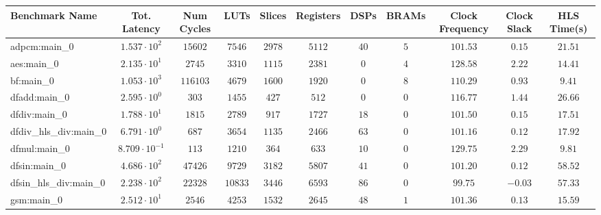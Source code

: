 \begin{tabular}{|l|c|c|c|c|c|c|c|c|c|c|}
\hline
Benchmark Name          & Tot. Latency            & Num Cycles & LUTs      & Slices    & Registers & DSPs    & BRAMs  & Clock Frequency & Clock Slack & HLS Time(s) \\
\hline
adpcm:main\_0           & $ 1.537 \cdot 10^{2}  $ & $ 15602  $ & $ 7546  $ & $ 2978  $ & $ 5112  $ & $ 40  $ & $ 5  $ & $ 101.53      $ & $ 0.15    $ & $ 21.51   $ \\
aes:main\_0             & $ 2.135 \cdot 10^{1}  $ & $ 2745   $ & $ 3310  $ & $ 1115  $ & $ 2381  $ & $ 0   $ & $ 4  $ & $ 128.58      $ & $ 2.22    $ & $ 14.41   $ \\
bf:main\_0              & $ 1.053 \cdot 10^{3}  $ & $ 116103 $ & $ 4679  $ & $ 1600  $ & $ 1920  $ & $ 0   $ & $ 8  $ & $ 110.29      $ & $ 0.93    $ & $ 9.41    $ \\
dfadd:main\_0           & $ 2.595 \cdot 10^{0}  $ & $ 303    $ & $ 1455  $ & $ 427   $ & $ 512   $ & $ 0   $ & $ 0  $ & $ 116.77      $ & $ 1.44    $ & $ 26.66   $ \\
dfdiv:main\_0           & $ 1.788 \cdot 10^{1}  $ & $ 1815   $ & $ 2789  $ & $ 917   $ & $ 1727  $ & $ 18  $ & $ 0  $ & $ 101.50      $ & $ 0.15    $ & $ 17.51   $ \\
dfdiv\_hls\_div:main\_0 & $ 6.791 \cdot 10^{0}  $ & $ 687    $ & $ 3654  $ & $ 1135  $ & $ 2466  $ & $ 63  $ & $ 0  $ & $ 101.16      $ & $ 0.12    $ & $ 17.92   $ \\
dfmul:main\_0           & $ 8.709 \cdot 10^{-1} $ & $ 113    $ & $ 1210  $ & $ 364   $ & $ 633   $ & $ 10  $ & $ 0  $ & $ 129.75      $ & $ 2.29    $ & $ 9.81    $ \\
dfsin:main\_0           & $ 4.686 \cdot 10^{2}  $ & $ 47426  $ & $ 9729  $ & $ 3182  $ & $ 5807  $ & $ 41  $ & $ 0  $ & $ 101.20      $ & $ 0.12    $ & $ 58.52   $ \\
dfsin\_hls\_div:main\_0 & $ 2.238 \cdot 10^{2}  $ & $ 22328  $ & $ 10833 $ & $ 3446  $ & $ 6593  $ & $ 86  $ & $ 0  $ & $ 99.75       $ & $ -0.03   $ & $ 57.33   $ \\
gsm:main\_0             & $ 2.512 \cdot 10^{1}  $ & $ 2546   $ & $ 4253  $ & $ 1532  $ & $ 2645  $ & $ 48  $ & $ 1  $ & $ 101.36      $ & $ 0.13    $ & $ 15.59   $ \\

\end{tabular}
